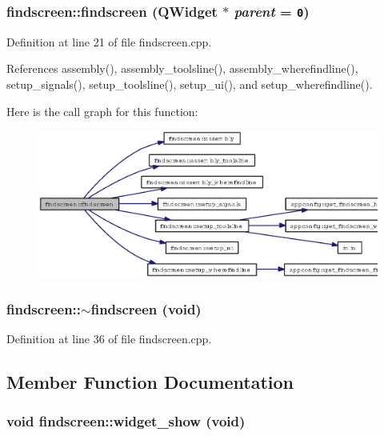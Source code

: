 \subsubsection{\setlength{\rightskip}{0pt plus 5cm}findscreen::findscreen (QWidget $\ast$ {\em parent} = {\tt 0})}\label{classfindscreen_642becd9c3569e1e9aacfdb96d693dcf}




Definition at line 21 of file findscreen.cpp.

References assembly(), assembly\_\-toolsline(), assembly\_\-wherefindline(), setup\_\-signals(), setup\_\-toolsline(), setup\_\-ui(), and setup\_\-wherefindline().

Here is the call graph for this function:\begin{figure}[H]
\begin{center}
\leavevmode
\includegraphics[width=330pt]{classfindscreen_642becd9c3569e1e9aacfdb96d693dcf_cgraph}
\end{center}
\end{figure}
\subsubsection{\setlength{\rightskip}{0pt plus 5cm}findscreen::$\sim$findscreen (void)\hspace{0.3cm}{\tt  [virtual]}}\label{classfindscreen_4165198100ade50addc48b0734d93c93}




Definition at line 36 of file findscreen.cpp.

\subsection{Member Function Documentation}
\subsubsection{\setlength{\rightskip}{0pt plus 5cm}void findscreen::widget\_\-show (void)\hspace{0.3cm}{\tt  [slot]}}\label{classfindscreen_90ec8cf049de60964e6f0037f8bb9eb4}




